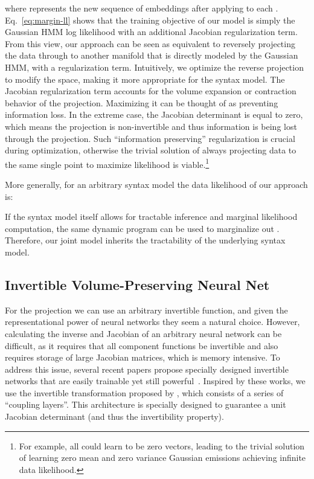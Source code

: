 \documentclass[11pt,a4paper]{article}
\begin{document}
where  represents the new sequence of embeddings after applying  to each . Eq.~\eqref{eq:margin-ll} shows that the training objective of our model is simply the Gaussian HMM log likelihood with an additional Jacobian regularization term. 
From this view, our approach can be seen as equivalent to reversely projecting the data through  to another manifold  that is directly modeled by the Gaussian HMM, with a regularization term. Intuitively, we optimize the reverse projection  to modify the  space, making it more appropriate for the syntax model. The Jacobian regularization term accounts for the volume expansion or contraction behavior of the projection. Maximizing it can be thought of as preventing information loss. In the extreme case, the Jacobian determinant is equal to zero, which means the projection is non-invertible and thus information is being lost through the projection. Such ``information preserving'' regularization is crucial during optimization, otherwise the trivial solution of always projecting data to the same single point to maximize likelihood is viable.\footnote{For example, all  could learn to be zero vectors, leading to the trivial solution of learning zero mean and zero variance Gaussian emissions achieving infinite data likelihood.}

More generally, for an arbitrary syntax model the data likelihood of our approach is:

If the syntax model itself allows for tractable inference and marginal likelihood computation, the same dynamic program can be used to marginalize out . Therefore, our joint model inherits the tractability of the underlying syntax model.


\subsection{Invertible Volume-Preserving Neural Net}
For the projection we can use an arbitrary invertible function, and given the representational power of neural networks they seem a natural choice. However, calculating the inverse and Jacobian of an arbitrary neural network can be difficult, as it requires that all component functions be invertible and also requires storage of large Jacobian matrices, which is memory intensive.
To address this issue, several recent papers propose specially designed invertible networks that are easily trainable yet still powerful~\citep{dinh2014nice, dinh2016density, jacobsen2018revnet}. Inspired by these works, we use the invertible transformation proposed by \citet{dinh2014nice}, which consists of a series of ``coupling layers''.  This architecture is specially designed to guarantee a unit Jacobian determinant (and thus the invertibility property).
\end{document}
